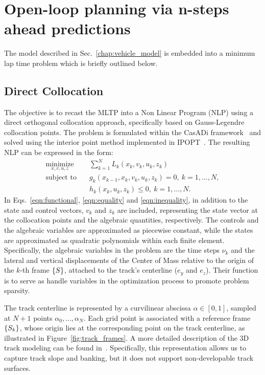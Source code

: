 \section{Open-loop planning via n-steps ahead predictions}
\label{sec:open_loop_planning}

The model described in Sec.~\ref{chap:vehicle_model} is embedded into a minimum lap time problem which is briefly outlined below.

\subsection{Direct Collocation}
The objective is to recast the MLTP into a Non Linear Program (NLP) using a direct orthogonal collocation approach, specifically based on Gauss-Legendre collocation points. The problem is formulated within the CasADi framework~\cite{Andersson:MPC:2019} and solved using the interior point method implemented in IPOPT~\cite{Wachter:MP:2006}. The resulting NLP can be expressed in the form:
\begin{align}
	\underset{x,v,u,z}{\textrm{minimize}}&\quad\sum_{k=1}^NL_k(x_k,v_k,u_k,z_k)\label{eqn:functional}\\
	\textrm{subject to}&\quad g_k(x_{k-1},x_k,v_k,u_k,z_k)=0,\ k=1,\ldots,N,\label{eqn:equality}\\
	&\quad h_k(x_k,u_k,z_k)\le0,\ k=1,\ldots,N.\label{eqn:inequality}
\end{align}
In Eqs.~\eqref{eqn:functional}, \eqref{eqn:equality} and \eqref{eqn:inequality}, in addition to the state and control vectors, $v_k$ and $z_k$ are included, representing the state vector at the collocation points and the algebraic quantities, respectively. The controls and the algebraic variables are approximated as piecewise constant, while the states are approximated as quadratic polynomials within each finite element. Specifically, the algebraic variables in the problem are the time steps $\nu_k$ and the lateral and vertical displacements of the Center of Mass relative to the origin of the $k$-th frame $\left\{S\right\}$, attached to the track's centerline ($e_y$ and $e_z$). Their function is to serve as handle variables in the optimization process to promote problem sparsity.

The track centerline is represented by a curvilinear abscissa $\alpha\in[0,1]$, sampled at $N+1$ points $\alpha_0,\ldots,\alpha_N$. Each grid point is associated with a reference frame $\left\{S_k\right\}$, whose origin lies at the corresponding point on the track centerline, as illustrated in Figure~\ref{fig:track_frames}. A more detailed description of the 3D track modeling can be found in~\cite{Bartali:Meccanica:2023}. Specifically, this representation allows us to capture track slope and banking, but it does not support non-developable track surfaces.

